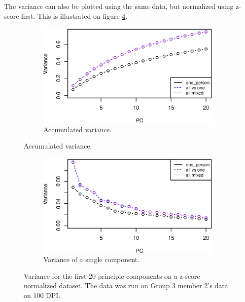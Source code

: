 The variance can also be plotted using the same data, but normalized using z-score first.
This is illustrated on figure \ref{fig:variance_zscore}.




\begin{figure}[H]
\centering
\begin{subfigure}{0.70\textwidth}
\centering
\includegraphics[width=\textwidth]{graphics/pca_acc_variance_zs}
\caption{Accumulated variance.}
\label{fig:pca_accumulated_var_zscore}
\end{subfigure}
\end{figure}
\begin{figure}[H]
\centering
\ContinuedFloat
\begin{subfigure}{0.70\textwidth}
\centering
\includegraphics[width=\textwidth]{graphics/pca_variance_zs}
\caption{Variance of a single component.}
\label{fig:pca_var_zscore}
\end{subfigure}
\caption[PCA variance when data is normalized using z-score.]{Variance for the first 20 principle components on a z-score normalized dataset.
The data was run on Group 3 member 2's data on 100 DPI. }
\label{fig:variance_zscore}
\end{figure}

